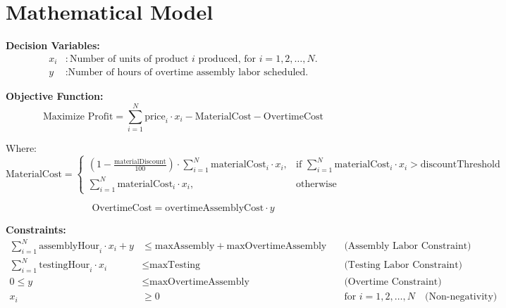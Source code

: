 \documentclass{article}
\begin{document}
\section*{Mathematical Model}

\textbf{Decision Variables:}
\begin{align*}
x_i & : \text{Number of units of product } i \text{ produced, for } i = 1, 2, \ldots, N. \\
y & : \text{Number of hours of overtime assembly labor scheduled.}
\end{align*}

\textbf{Objective Function:}
\[
\text{Maximize } \text{Profit} = \sum_{i=1}^{N} \text{price}_i \cdot x_i - \text{MaterialCost} - \text{OvertimeCost}
\]

Where:
\[
\text{MaterialCost} = \begin{cases} 
(1 - \frac{\text{materialDiscount}}{100}) \cdot \sum_{i=1}^{N} \text{materialCost}_i \cdot x_i, & \text{if } \sum_{i=1}^{N} \text{materialCost}_i \cdot x_i > \text{discountThreshold} \\
\sum_{i=1}^{N} \text{materialCost}_i \cdot x_i, & \text{otherwise}
\end{cases}
\]

\[
\text{OvertimeCost} = \text{overtimeAssemblyCost} \cdot y
\]

\textbf{Constraints:}
\begin{align*}
\sum_{i=1}^{N} \text{assemblyHour}_i \cdot x_i + y & \leq \text{maxAssembly} + \text{maxOvertimeAssembly} \quad & \text{(Assembly Labor Constraint)} \\
\sum_{i=1}^{N} \text{testingHour}_i \cdot x_i & \leq \text{maxTesting} \quad & \text{(Testing Labor Constraint)} \\
0 \leq y & \leq \text{maxOvertimeAssembly} \quad & \text{(Overtime Constraint)} \\
x_i & \geq 0 \quad & \text{for } i = 1, 2, \ldots, N \quad \text{(Non-negativity)}
\end{align*}
\end{document}
